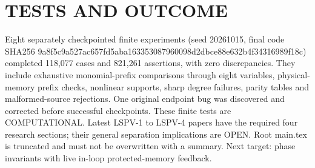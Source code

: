 \documentclass{article}
\begin{document}
\section{TESTS AND OUTCOME}
Eight separately checkpointed finite experiments (seed 20261015, final code SHA256 9a8f5c9a527ac657fd5aba163353087960098d2dbce88e632b4f34316989f18c) completed 118,077 cases and 821,261 assertions, with zero discrepancies. They include exhaustive monomial-prefix comparisons through eight variables, physical-memory prefix checks, nonlinear supports, sharp degree failures, parity tables and malformed-source rejections. One original endpoint bug was discovered and corrected before successful checkpoints. These finite tests are COMPUTATIONAL. Latest LSPV-1 to LSPV-4 papers have the required four research sections; their general separation implications are OPEN. Root main.tex is truncated and must not be overwritten with a summary. Next target: phase invariants with live in-loop protected-memory feedback.
\end{document}
